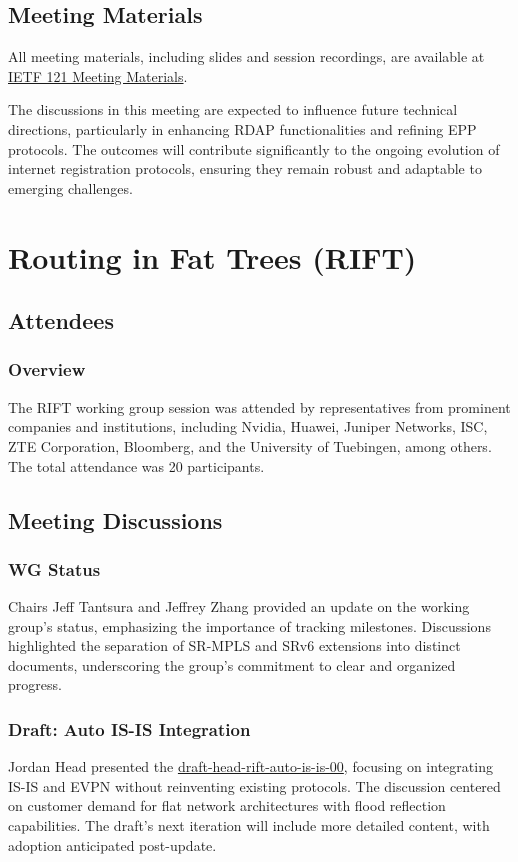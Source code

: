 \documentclass{article}
\begin{document}
\subsection{Meeting Materials}
All meeting materials, including slides and session recordings, are available at \href{https://datatracker.ietf.org/meeting/121/materials/}{IETF 121 Meeting Materials}.

The discussions in this meeting are expected to influence future technical directions, particularly in enhancing RDAP functionalities and refining EPP protocols. The outcomes will contribute significantly to the ongoing evolution of internet registration protocols, ensuring they remain robust and adaptable to emerging challenges.



\newpage

\section{Routing in Fat Trees (RIFT)}

\subsection{Attendees}
\subsubsection{Overview}
The RIFT working group session was attended by representatives from prominent companies and institutions, including Nvidia, Huawei, Juniper Networks, ISC, ZTE Corporation, Bloomberg, and the University of Tuebingen, among others. The total attendance was 20 participants.

\subsection{Meeting Discussions}

\subsubsection{WG Status}
Chairs Jeff Tantsura and Jeffrey Zhang provided an update on the working group's status, emphasizing the importance of tracking milestones. Discussions highlighted the separation of SR-MPLS and SRv6 extensions into distinct documents, underscoring the group's commitment to clear and organized progress.

\subsubsection{Draft: Auto IS-IS Integration}
Jordan Head presented the \href{https://datatracker.ietf.org/doc/html/draft-ietf-rift-auto-is-is-00}{draft-head-rift-auto-is-is-00}, focusing on integrating IS-IS and EVPN without reinventing existing protocols. The discussion centered on customer demand for flat network architectures with flood reflection capabilities. The draft's next iteration will include more detailed content, with adoption anticipated post-update.
\end{document}
